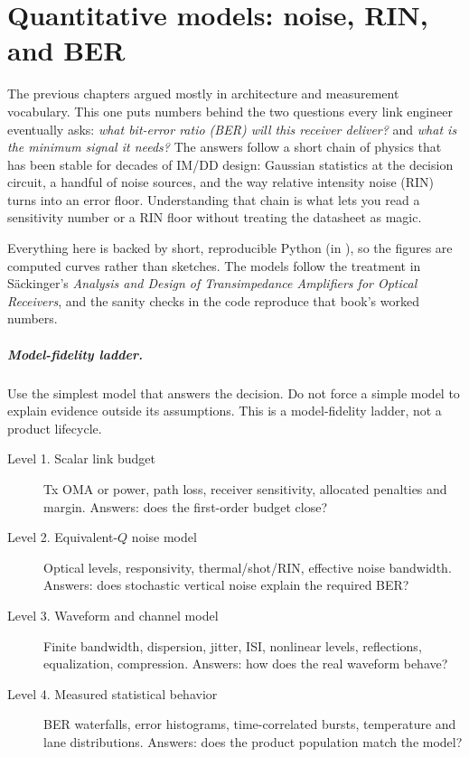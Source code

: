 \chapter{Quantitative models: noise, RIN, and BER}
\label{ch:models}

The previous chapters argued mostly in architecture and measurement vocabulary.
This one puts numbers behind the two questions every link engineer eventually
asks: \emph{what bit-error ratio (BER) will this receiver deliver?} and
\emph{what is the minimum signal it needs?} The answers follow a short chain of
physics that has been stable for decades of IM/DD design: Gaussian statistics at
the decision circuit, a handful of noise sources, and the way relative intensity
noise (RIN) turns into an error floor. Understanding that chain is what lets you
read a sensitivity number or a RIN floor without treating the datasheet as magic.

Everything here is backed by short, reproducible Python (in ), so the
figures are computed curves rather than sketches. The models follow the treatment
in Säckinger's \emph{Analysis and Design of Transimpedance Amplifiers for Optical
Receivers}, and the sanity checks in
the code reproduce that book's worked numbers.

\paragraph{Model-fidelity ladder.}
Use the simplest model that answers the decision. Do not force a simple model
to explain evidence outside its assumptions. This is a model-fidelity ladder,
not a product lifecycle.
\begin{description}
\item[Level 1. Scalar link budget] Tx OMA or power, path loss, receiver
      sensitivity, allocated penalties and margin. Answers: does the first-order
      budget close?
\item[Level 2. Equivalent-$Q$ noise model] Optical levels, responsivity,
      thermal/shot/RIN, effective noise bandwidth. Answers: does stochastic
      vertical noise explain the required BER?
\item[Level 3. Waveform and channel model] Finite bandwidth, dispersion,
      jitter, ISI, nonlinear levels, reflections, equalization, compression.
      Answers: how does the real waveform behave?
\item[Level 4. Measured statistical behavior] BER waterfalls, error
      histograms, time-correlated bursts, temperature and lane distributions.
      Answers: does the product population match the model?
\end{description}

